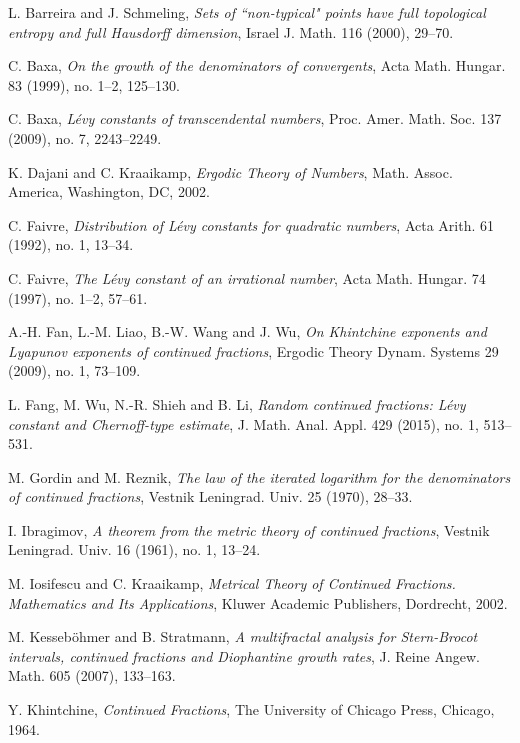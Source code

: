 \documentclass[reqno]{amsart}
\theoremstyle{definition}
\numberwithin{equation}{section}
\begin{document}
\begin{thebibliography}{10}
 L. Barreira and J. Schmeling, {\it Sets of ``non-typical" points have full topological entropy and full Hausdorff dimension}, Israel J. Math. 116 (2000), 29--70.

 C. Baxa, {\it On the growth of the denominators of convergents}, Acta Math. Hungar. 83 (1999), no. 1--2, 125--130.

 C. Baxa, {\it L\'{e}vy constants of transcendental numbers}, Proc. Amer. Math. Soc. 137 (2009), no. 7, 2243--2249.

 K. Dajani and C. Kraaikamp, {\it Ergodic Theory of Numbers}, Math. Assoc. America, Washington, DC, 2002.

 C. Faivre, {\it Distribution of L\'{e}vy constants for quadratic numbers}, Acta Arith. 61 (1992), no. 1, 13--34.

 C. Faivre, {\it The L\'{e}vy constant of an irrational number}, Acta Math. Hungar. 74 (1997), no. 1--2, 57--61.

 A.-H. Fan, L.-M. Liao, B.-W. Wang and J. Wu, {\it On Khintchine exponents and Lyapunov exponents of continued fractions}, Ergodic Theory Dynam. Systems 29 (2009), no. 1, 73--109.

 L. Fang, M. Wu, N.-R. Shieh and B. Li, {\it Random continued fractions: L\'{e}vy constant and Chernoff-type estimate}, J. Math. Anal. Appl. 429 (2015), no. 1, 513--531.

 M. Gordin and M. Reznik, {\it The law of the iterated logarithm for the denominators of continued fractions}, Vestnik Leningrad. Univ. 25 (1970), 28--33.

 I. Ibragimov, {\it A theorem from the metric theory of continued fractions}, Vestnik Leningrad. Univ. 16 (1961), no. 1, 13--24.

 M. Iosifescu and C. Kraaikamp, {\it Metrical Theory of Continued Fractions. Mathematics and Its Applications}, Kluwer Academic Publishers, Dordrecht, 2002.

 M. Kesseb\"{o}hmer and B. Stratmann, {\it A multifractal analysis for Stern-Brocot intervals, continued fractions and Diophantine growth rates}, J. Reine Angew. Math. 605 (2007), 133--163.

 Y. Khintchine, {\it Continued Fractions}, The University of Chicago Press, Chicago, 1964.


\end{thebibliography}
\end{document}
